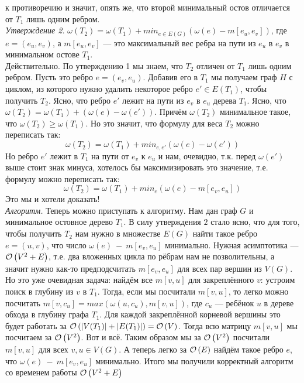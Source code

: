 к противоречию и значит, опять же, что второй минимальный остов отличается от $T_1$ лишь одним ребром. \xqed\\
\textit{Утверждение 2.} \underline{$\omega(T_2) = \omega(T_1) + min_{e\in E(G)}(\omega(e) - m[e_u,e_v])$}, где $e = (e_u,e_v)$, 
а $m[e_u,e_v]$ --- это максимальный вес ребра на пути из $e_u$ в $e_v$ в минимальном остове $T_1$.\\
Действительно. По утверждению 1 мы знаем, что $T_2$ отличен от $T_1$ лишь одним ребром. Пусть это ребро $e = (e_v, e_u)$. Добавив его
в $T_1$ мы получаем граф $H$ с циклом, из которого нужно удалить некоторое ребро $e' \in E(T_1)$, чтобы получить $T_2$. Ясно, что
ребро $e'$ лежит на пути из $e_v$ в $e_u$ дерева $T_1$. Ясно, что $\omega(T_2)=\omega(T_1)+(\omega(e)-\omega(e'))$. Причём
$\omega(T_2)$ минимальное такое, что $\omega(T_2) \geq \omega(T_1)$. Но это значит, что формулу для веса $T_2$ можно переписать
так:
\[ \omega(T_2) = \omega(T_1) + min_{e,e'}(\omega(e)-\omega(e'))\]
Но ребро $e'$ лежит в $T_1$ на пути от $e_v$ к $e_u$ и нам, очевидно, т.к. перед $\omega(e')$ выше стоит знак минуса,
хотелось бы максимизировать это значение, т.е. формулу можно переписать так:
\[ \omega(T_2) = \omega(T_1) + min_{e}(\omega(e)-m[e_v,e_u])\]
Это мы и хотели доказать! \xqed\\
\textit{Алгоритм.} Теперь можно приступать к алгоритму. Нам дан граф $G$ и минимальное остовное дерево $T_1$.
В силу утверждения $2$ стало ясно, что для того, чтобы получить $T_2$ нам нужно в множестве $E(G)$ найти такое ребро 
$e = (u, v)$, что число $\omega(e)~-~m[e_v,e_u]$ минимально. Нужная асимптотика --- $\mathcal{O}\left(V^2 + E\right)$, т.е. два вложенных
цикла по рёбрам нам не позволительны, а значит нужно как-то предподсчитать $m[e_v,e_u]$ для всех пар вершин из $V(G)$.
Но это уже очевидная задача: найдём все $m[v,u]$ для закреплённого $v$: устроим поиск в глубину из $v$ в $T_1$. Тогда,
если мы посчитали $m[v,u]$, то легко можно посчитать $m[v,c_u] = max(\omega(u,c_u),m[v,u])$, 
где $c_u$ --- ребёнок $u$ в дереве обхода в глубину графа $T_1$. Для каждой закреплённой корневой вершины это будет работать
за $\mathcal{O}\left(|V(T_1)|+|E(T_1)|\right) = \mathcal{O}\left(V\right)$. Тогда всю матрицу $m[v,u]$ мы посчитаем за $\mathcal{O}\left(V^2\right)$. Вот и всё. Таким образом 
мы за $\mathcal{O}\left(V^2\right)$ посчитали $m[v,u]$ для всех $v,u\in V(G)$. А теперь легко за $\mathcal{O}\left(E\right)$ найдём такое ребро $e$, что
$\omega(e)~-~m[e_v,e_u]$ минимально. Итого мы получили корректный алгоритм со временем работы $\mathcal{O}\left(V^2+E\right)$ \xqed





